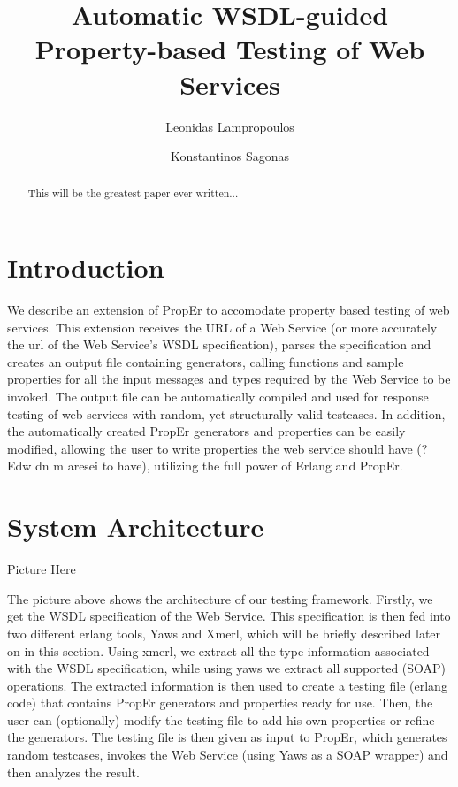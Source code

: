 \documentclass[submission,copyright,a4]{eptcs}
\title{Automatic WSDL-guided Property-based Testing of Web Services}
\author{Leonidas Lampropoulos \and Konstantinos Sagonas}
\begin{document}
\maketitle

\begin{abstract}
 This will be the greatest paper ever written...
\end{abstract}

\section{Introduction}

We describe an extension of PropEr to accomodate property based testing of web services. This extension receives the URL of a Web Service (or more accurately the url of the Web Service's WSDL specification), parses the specification and creates an output file containing generators, calling functions and sample properties for all the input messages and types required by the Web Service to be invoked. The output file can be automatically compiled and used for response testing of web services with random, yet structurally valid testcases. In addition, the automatically created PropEr generators and properties can be easily modified, allowing the user to write properties the web service should have (? Edw dn m aresei to have), utilizing the full power of Erlang and PropEr.

\section{System Architecture}

Picture Here

The picture above shows the architecture of our testing framework. Firstly, we get the WSDL specification of the Web Service. This specification is then fed into two different erlang tools, Yaws and Xmerl, which will be briefly described later on in this section. Using xmerl, we extract all the type information associated with the WSDL specification, while using yaws we extract all supported (SOAP) operations. The extracted information is then used to create a testing file (erlang code) that contains PropEr generators and properties ready for use. Then, the user can (optionally) modify the testing file to add his own properties or refine the generators. The testing file is then given as input to PropEr, which generates random testcases, invokes the Web Service (using Yaws as a SOAP wrapper) and then analyzes the result.
\end{document}
